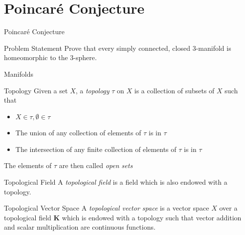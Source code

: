 \documentclass[handout]{beamer}
\newcommand{\Poincare}{Poincar\'{e}}
\begin{document}
  \section{\Poincare{} Conjecture}
  \begin{frame}{\Poincare{} Conjecture}
      \begin{block}{Problem Statement}
          Prove that every simply connected, closed 3-manifold is
          homeomorphic to the 3-sphere.
      \end{block}
  \end{frame}
  \begin{frame}{Manifolds}
      \linespread{0.9}
      \pause
      \begin{block}{Topology}
          Given a set $X$, a \textit{topology} $\tau$ on $X$ is a collection of
          subsets of $X$ such that
          \begin{itemize}
              \item $X \in \tau, \emptyset \in \tau$
              \item The union of any collection of elements of $\tau$ is in
                  $\tau$
              \item The intersection of any \alert{finite} collection of
                  elements of $\tau$ is in $\tau$
          \end{itemize}
          The elements of $\tau$ are then called \textit{open sets}
      \end{block}
      \pause
      \begin{block}{Topological Field}
          A \textit{topological field} is a field which is also endowed with a
          topology.
      \end{block}
      \pause
      \begin{block}{Topological Vector Space}
          A \textit{topological vector space} is a vector space $X$ over a
          topological field $\mathbf{K}$ which is endowed with a topology such
          that vector addition and scalar multiplication are continuous
          functions.
      \end{block}
  \end{frame}
\end{document}
